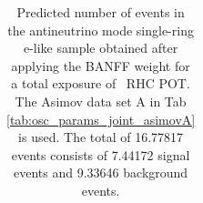 \begin{table}
\begin{tabular} { | l ||r | r | r | r | r | r | | r | }
	\end{tabular}
	\caption{Predicted number of events in the antineutrino mode single-ring e-like sample obtained after applying the BANFF weight for a total exposure of \TotalPotNuBarRunOneNine\ RHC POT. The Asimov data set A in Tab \ref{tab:osc_params_joint_asimovA} is used. The total of 16.77817 events consists of 7.44172 signal events and 9.33646 background events.}
	\label{tab:event_rates_exp_RHC1Re_Run1-9d}
\end{table}

%
%
%
%
%
%
%
%
%
%

